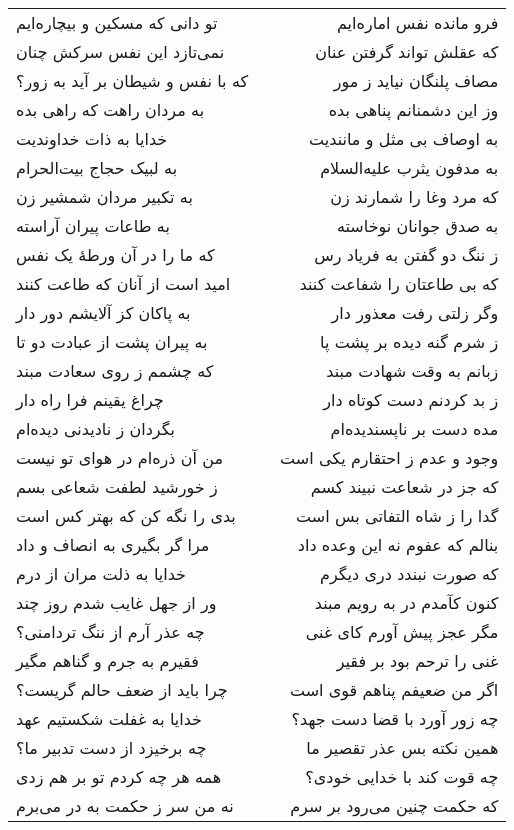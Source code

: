 \begin{center}
\begin{longtable}{l p{0.5cm} r}
تو دانی که مسکین و بیچاره‌ایم
&&
فرو مانده نفس اماره‌ایم
\\
نمی‌تازد این نفس سرکش چنان
&&
که عقلش تواند گرفتن عنان
\\
که با نفس و شیطان بر آید به زور؟
&&
مصاف پلنگان نیاید ز مور
\\
به مردان راهت که راهی بده
&&
وز این دشمنانم پناهی بده
\\
خدایا به ذات خداوندیت
&&
به اوصاف بی مثل و مانندیت
\\
به لبیک حجاج بیت‌الحرام
&&
به مدفون یثرب علیه‌السلام
\\
به تکبیر مردان شمشیر زن
&&
که مرد وغا را شمارند زن
\\
به طاعات پیران آراسته
&&
به صدق جوانان نوخاسته
\\
که ما را در آن ورطهٔ یک نفس
&&
ز ننگ دو گفتن به فریاد رس
\\
امید است از آنان که طاعت کنند
&&
که بی طاعتان را شفاعت کنند
\\
به پاکان کز آلایشم دور دار
&&
وگر زلتی رفت معذور دار
\\
به پیران پشت از عبادت دو تا
&&
ز شرم گنه دیده بر پشت پا
\\
که چشمم ز روی سعادت مبند
&&
زبانم به وقت شهادت مبند
\\
چراغ یقینم فرا راه دار
&&
ز بد کردنم دست کوتاه دار
\\
بگردان ز نادیدنی دیده‌ام
&&
مده دست بر ناپسندیده‌ام
\\
من آن ذره‌ام در هوای تو نیست
&&
وجود و عدم ز احتقارم یکی است
\\
ز خورشید لطفت شعاعی بسم
&&
که جز در شعاعت نبیند کسم
\\
بدی را نگه کن که بهتر کس است
&&
گدا را ز شاه التفاتی بس است
\\
مرا گر بگیری به انصاف و داد
&&
بنالم که عفوم نه این وعده داد
\\
خدایا به ذلت مران از درم
&&
که صورت نبندد دری دیگرم
\\
ور از جهل غایب شدم روز چند
&&
کنون کآمدم در به رویم مبند
\\
چه عذر آرم از ننگ تردامنی؟
&&
مگر عجز پیش آورم کای غنی
\\
فقیرم به جرم و گناهم مگیر
&&
غنی را ترحم بود بر فقیر
\\
چرا باید از ضعف حالم گریست؟
&&
اگر من ضعیفم پناهم قوی است
\\
خدایا به غفلت شکستیم عهد
&&
چه زور آورد با قضا دست جهد؟
\\
چه برخیزد از دست تدبیر ما؟
&&
همین نکته بس عذر تقصیر ما
\\
همه هر چه کردم تو بر هم زدی
&&
چه قوت کند با خدایی خودی؟
\\
نه من سر ز حکمت به در می‌برم
&&
که حکمت چنین می‌رود بر سرم
\\
\end{longtable}
\end{center}
